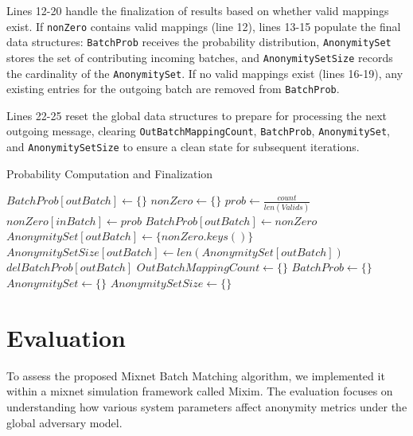 \documentclass{article}
\begin{document}
Lines 12-20 handle the finalization of results 
based on whether valid mappings exist. 
If \texttt{nonZero} contains valid mappings (line 12), 
lines 13-15 populate the final data 
structures: \texttt{BatchProb} receives the 
probability distribution, \texttt{AnonymitySet} 
stores the set of contributing incoming batches, 
and \texttt{AnonymitySetSize} records the 
cardinality of the \texttt{AnonymitySet}. 
If no valid mappings exist (lines 16-19), 
any existing entries for the outgoing batch 
are removed from \texttt{BatchProb}.

Lines 22-25 reset the global data structures 
to prepare for processing the next outgoing 
message, clearing \texttt{OutBatchMappingCount}, 
\texttt{BatchProb}, \texttt{AnonymitySet}, 
and \texttt{AnonymitySetSize} to ensure a 
clean state for subsequent iterations.

\begin{algorithm}
\caption{Probability Computation and Finalization}
\label{alg:phase5}
\begin{algorithmic}[1]
        \State $ BatchProb[outBatch] \gets \{ \} $
    \EndIf
    \State $ nonZero \gets \{ \} $
        \State $ prob \gets \frac{count}{len(Valids)}$
            \State $ nonZero[inBatch] \gets prob $
        \EndIf
    \EndFor
        \State $ BatchProb[outBatch] \gets nonZero $
        \State $ AnonymitySet[outBatch] \gets \{ nonZero.keys() \} $
        \State $ AnonymitySetSize[outBatch] \gets len(AnonymitySet[outBatch]) $
    \Else
            \State $ del BatchProb[outBatch] $
        \EndIf
    \EndIf
\EndFor
\State $OutBatchMappingCount \gets \{ \} $
\State $ BatchProb \gets \{ \} $
\State $ AnonymitySet \gets \{ \} $
\State $ AnonymitySetSize \gets \{ \} $
\end{algorithmic}
\end{algorithm}

\section{Evaluation}
\label{sec:evaluation}

To assess the proposed Mixnet Batch Matching 
algorithm, we implemented it within a mixnet simulation framework 
called Mixim. The evaluation focuses on understanding how various 
system parameters affect anonymity metrics under the global 
adversary model.
\end{document}

